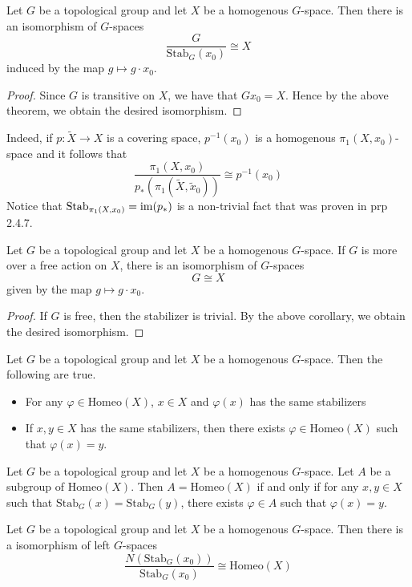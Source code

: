 \documentclass[a4paper]{article}
\begin{document}
\begin{crl}{}{} Let $G$ be a topological group and let $X$ be a homogenous $G$-space. Then there is an isomorphism of $G$-spaces $$\frac{G}{\text{Stab}_G(x_0)}\cong X$$ induced by the map $g\mapsto g\cdot x_0$. \tcbline
\begin{proof}
Since $G$ is transitive on $X$, we have that $Gx_0=X$. Hence by the above theorem, we obtain the desired isomorphism. 
\end{proof}
\end{crl}

Indeed, if $p:\tilde{X}\to X$ is a covering space, $p^{-1}(x_0)$ is a homogenous $\pi_1(X,x_0)$-space and it follows that $$\frac{\pi_1(X,x_0)}{p_\ast(\pi_1(\tilde{X},\tilde{x}_0))}\cong p^{-1}(x_0)$$ Notice that $\text{Stab}_{\pi_1(X,x_0)}=\operatorname{im}(p_\ast)$ is a non-trivial fact that was proven in prp 2.4.7. 

\begin{crl}{}{} Let $G$ be a topological group and let $X$ be a homogenous $G$-space. If $G$ is more over a free action on $X$, there is an isomorphism of $G$-spaces $$G\cong X$$ given by the map $g\mapsto g\cdot x_0$. \tcbline
\begin{proof}
If $G$ is free, then the stabilizer is trivial. By the above corollary, we obtain the desired isomorphism. 
\end{proof}
\end{crl}

\begin{thm}{}{} Let $G$ be a topological group and let $X$ be a homogenous $G$-space. Then the following are true. 
\begin{itemize}
\item For any $\varphi\in\text{Homeo}(X)$, $x\in X$ and $\varphi(x)$ has the same stabilizers
\item If $x,y\in X$ has the same stabilizers, then there exists $\varphi\in\text{Homeo}(X)$ such that $\varphi(x)=y$. 
\end{itemize}
\end{thm}

\begin{lmm}{}{} Let $G$ be a topological group and let $X$ be a homogenous $G$-space. Let $A$ be a subgroup of $\text{Homeo}(X)$. Then $A=\text{Homeo}(X)$ if and only if for any $x,y\in X$ such that $\text{Stab}_G(x)=\text{Stab}_G(y)$, there exists $\varphi\in A$ such that $\varphi(x)=y$. 
\end{lmm}

\begin{thm}{}{} Let $G$ be a topological group and let $X$ be a homogenous $G$-space. Then there is a isomorphism of left $G$-spaces $$\frac{N(\text{Stab}_G(x_0))}{\text{Stab}_G(x_0)}\cong\text{Homeo}(X)$$
\end{thm}
\end{document}
